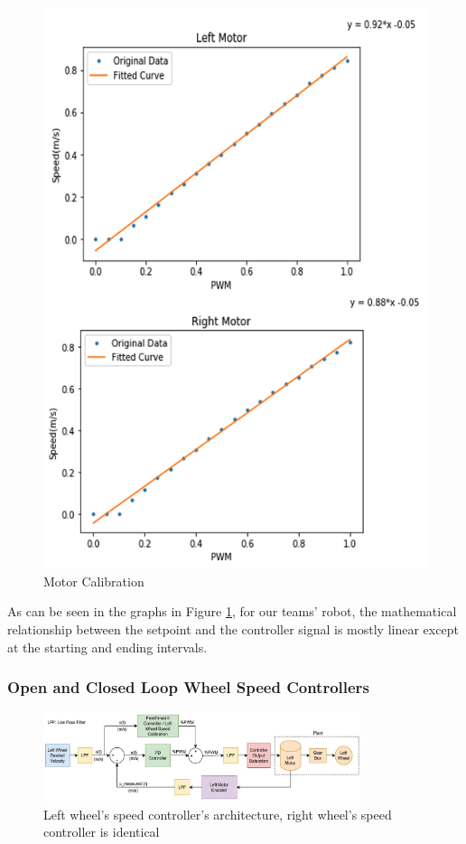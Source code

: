 \documentclass[journal]{IEEEtran}
\begin{document}
\begin{figure}[h]
\begin{center}
\includegraphics[width=0.9\linewidth]{image_1/figure_1_1_1.jpg}
\end{center}
   \caption{Motor Calibration}
   \label{Figure_1_1_1}
\end{figure}

As can be seen in the graphs in Figure \ref{Figure_1_1_1}, for our teams’ robot, the mathematical relationship between the setpoint and the controller signal is mostly linear except at the starting and ending intervals.\\

\subsubsection{Open and Closed Loop Wheel Speed Controllers} \hfill

\begin{figure}[h]
\begin{center}
\includegraphics[width=0.83\textwidth]{image_1/figure_1_2_1.jpg}
\end{center}
   \caption{Left wheel’s speed controller’s architecture, right wheel’s speed controller is identical}
   \label{Figure_1_2_1}
\end{figure}
\end{document}
